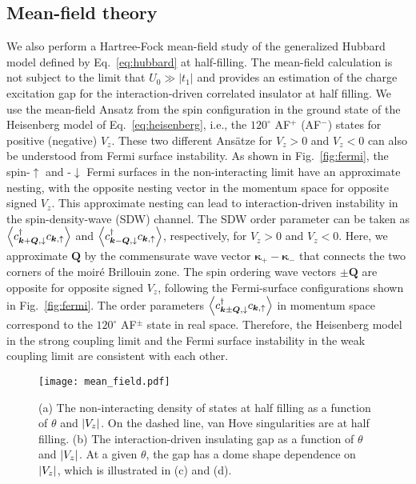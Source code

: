 \documentclass[aps,prx,floatfix,twocolumn]{revtex4-1}
\begin{document}
	\subsection{Mean-field theory}
	We also perform a Hartree-Fock mean-field study of the generalized Hubbard model defined by Eq.~\eqref{eq:hubbard} at half-filling. The mean-field calculation is not subject to the limit that $U_0 \gg |t_1|$ and provides an estimation of the charge excitation gap for the interaction-driven correlated insulator at half filling. We use the mean-field Ansatz from the spin configuration in the ground state of the Heisenberg model of Eq.~\eqref{eq:heisenberg}, i.e., the $120^{\circ}$ AF$^{+}$ (AF$^{-}$) states for positive (negative) $V_z$. These two different Ans\"atze for $V_z>0$ and $V_z<0$ can also be understood from Fermi surface instability. As shown in Fig.~\ref{fig:fermi}, the spin-$\uparrow$ and -$\downarrow$ Fermi surfaces in the non-interacting limit have an approximate nesting, with the opposite nesting vector in the momentum space for opposite signed $ V_z $. This approximate nesting can lead to interaction-driven instability in the spin-density-wave (SDW) channel.  The SDW order parameter can be taken as $\expval{c_{\bm{k}+ \bm{Q},\downarrow}^\dagger c_{\bm{k},\uparrow}}$ and $\expval{c_{\bm{k}- \bm{Q},\downarrow}^\dagger c_{\bm{k},\uparrow}}$, respectively, for $V_z>0$ and $V_z<0$. Here, we approximate  $\bm{Q}$ by the commensurate  wave vector $\bm{\kappa}_+-\bm{\kappa}_-$ that connects the two corners of the moir\'e Brillouin zone. The spin ordering wave vectors $\pm \bm{Q}$ are opposite for opposite signed $V_z$, following the Fermi-surface configurations shown in Fig.~\ref{fig:fermi}. The order parameters $\expval{c_{\bm{k} \pm \bm{Q},\downarrow}^\dagger c_{\bm{k},\uparrow}}$  in momentum space correspond to the  $120^{\circ}$ AF$^{\pm}$ state in real space. Therefore, the Heisenberg model in the strong coupling limit and the Fermi surface instability in the weak coupling limit are consistent with each other. 
	
	\begin{figure}[t]
		\centering
		\texttt{[image: mean\_field.pdf]}
		\caption{(a) The non-interacting density of states at half filling as a function of $\theta$ and $\abs{V_z}$. On the dashed line, van Hove singularities are at half filling. (b) The interaction-driven insulating gap as a function of  $\theta$ and $\abs{V_z}$. At a given $\theta$, the gap has a dome shape dependence on $\abs{V_z}$, which is illustrated in (c) and (d).}	
		\label{fig:mean_field}
	\end{figure}		
	
\end{document}
